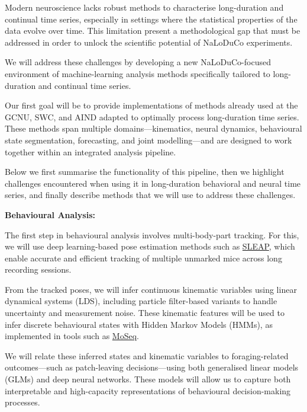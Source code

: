 Modern neuroscience lacks robust methods to characterise long-duration and
continual time series, especially in settings where the statistical properties
of the data evolve over time. This limitation present a methodological gap that
must be addressed in order to unlock the scientific potential of NaLoDuCo
experiments.

We will address these challenges by developing a new NaLoDuCo-focused
environment of machine-learning analysis methods specifically tailored to
long-duration and continual time series.

Our first goal will be to provide implementations of methods already used at
the GCNU, SWC, and AIND adapted to optimally process long-duration time series.
These methods span multiple domains—kinematics, neural dynamics, behavioural
state segmentation, forecasting, and joint modelling—and are designed to work
together within an integrated analysis pipeline.

Below we first summarise the functionality of this pipeline, then we highlight
challenges encountered when using it in long-duration behavioral and neural
time series, and finally describe methods that we will use to address these
challenges.


\noindent\textbf{Behavioural Analysis:}

The first step in behavioural analysis involves multi-body-part tracking. For
this, we will use deep learning-based pose estimation methods such as
\href{https://github.com/talmolab/sleap}{SLEAP}, which enable accurate and
efficient tracking of multiple unmarked mice across long recording sessions.

From the tracked poses, we will infer continuous kinematic variables using
linear dynamical systems (LDS), including particle filter-based variants to
handle uncertainty and measurement noise. These kinematic features will be used
to infer discrete behavioural states with Hidden Markov Models (HMMs), as
implemented in tools such as
\href{https://dattalab.github.io/moseq2-website/index.html}{MoSeq}.

We will relate these inferred states and kinematic variables to
foraging-related outcomes—such as patch-leaving decisions—using both
generalised linear models (GLMs) and deep neural networks. These models will
allow us to capture both interpretable and high-capacity representations of
behavioural decision-making processes.


